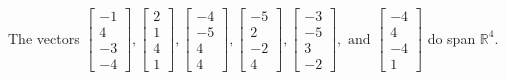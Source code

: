 \begin{exercise}
\begin{exerciseStatement}
  \end{exerciseStatement}
  \begin{exerciseAnswer}
   The vectors \(\left[\begin{array}{r}
-1 \\
4 \\
-3 \\
-4
\end{array}\right] , \left[\begin{array}{r}
2 \\
1 \\
4 \\
1
\end{array}\right] , \left[\begin{array}{r}
-4 \\
-5 \\
4 \\
4
\end{array}\right] , \left[\begin{array}{r}
-5 \\
2 \\
-2 \\
4
\end{array}\right] , \left[\begin{array}{r}
-3 \\
-5 \\
3 \\
-2
\end{array}\right] , \text{ and } \left[\begin{array}{r}
-4 \\
4 \\
-4 \\
1
\end{array}\right]\) 
  	 do  
	span \(\mathbb{R}^4\).
  


  \end{exerciseAnswer}
\end{exercise}